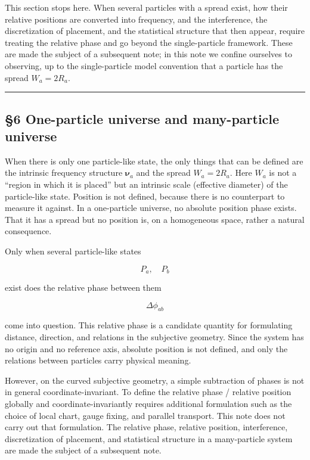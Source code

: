 \documentclass[
]{article}
\begin{document}
This section stops here. When several particles with a spread exist, how
their relative positions are converted into frequency, and the
interference, the discretization of placement, and the statistical
structure that then appear, require treating the relative phase and go
beyond the single-particle framework. These are made the subject of a
subsequent note; in this note we confine ourselves to observing, up to
the single-particle model convention that a particle has the spread
\(W_a=2R_a\).

\begin{center}\rule{0.5\linewidth}{0.5pt}\end{center}

\subsection{§6 One-particle universe and many-particle
universe}\label{one-particle-universe-and-many-particle-universe}

When there is only one particle-like state, the only things that can be
defined are the intrinsic frequency structure \(\boldsymbol{\nu}_a\) and
the spread \(W_a=2R_a\). Here \(W_a\) is not a ``region in which it is
placed'' but an intrinsic scale (effective diameter) of the
particle-like state. Position is not defined, because there is no
counterpart to measure it against. In a one-particle universe, no
absolute position phase exists. That it has a spread but no position is,
on a homogeneous space, rather a natural consequence.

Only when several particle-like states

\[P_a,\quad P_b\]

exist does the relative phase between them

\[\Delta\phi_{ab}\]

come into question. This relative phase is a candidate quantity for
formulating distance, direction, and relations in the subjective
geometry. Since the system has no origin and no reference axis, absolute
position is not defined, and only the relations between particles carry
physical meaning.

However, on the curved subjective geometry, a simple subtraction of
phases is not in general coordinate-invariant. To define the relative
phase / relative position globally and coordinate-invariantly requires
additional formulation such as the choice of local chart, gauge fixing,
and parallel transport. This note does not carry out that formulation.
The relative phase, relative position, interference, discretization of
placement, and statistical structure in a many-particle system are made
the subject of a subsequent note.
\end{document}
